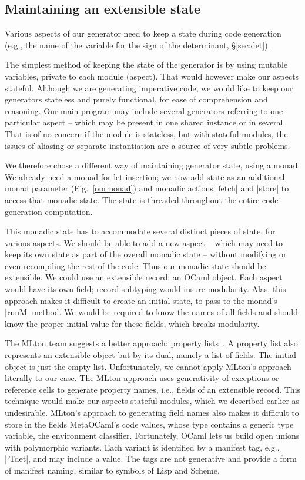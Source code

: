 \documentclass{elsart}
\begin{document}
\subsection{Maintaining an extensible state}

Various aspects of our generator need to keep a state during
code generation (e.g., the name of the variable for the sign of
the determinant, \S\ref{sec:det}).

The simplest method of keeping the state of the generator is by using
mutable variables, private to each module (aspect). That would however
make our aspects stateful. Although we are generating imperative code,
we would like to keep our generators stateless and purely functional,
for ease of comprehension and reasoning.  Our main program may include
several generators referring to one particular aspect -- which may be
present in one shared instance or in several. That is of no concern if
the module is stateless, but with stateful modules, the issues of
aliasing or separate instantiation are a source of very subtle
problems.

We therefore chose a different way of maintaining generator state,
using a monad. We already need a monad for let-insertion; we now add state as
an additional monad parameter (Fig.~\ref{ourmonad}) and monadic
actions |fetch| and |store| to access that monadic state. The state is
threaded throughout the entire code-generation computation. 

This monadic state has to accommodate several distinct pieces of state, for
various aspects. We should be able to add a new aspect -- which may need
to keep its own state as part of the overall monadic state -- without
modifying or even recompiling the rest of the code. Thus our monadic
state should be extensible. We could use an extensible
record: an OCaml object. Each aspect would have its own field; record
subtyping would insure modularity. Alas, this approach makes it
difficult to create an initial state, to pass to the monad's |runM|
method. We would be required to know the names of all fields and should know
the proper initial value for these fields, which breaks modularity.

The MLton team suggests a better approach: property 
lists~\cite{mlton-proplist}.  A property list also represents an
extensible object but by its dual, namely a list of fields.  The
initial object is just the empty list.  Unfortunately, we cannot apply
MLton's approach literally to our case. The MLton
approach uses generativity of exceptions or reference cells to
generate property names, i.e., fields of an extensible record. This
technique would make our aspects stateful modules, which we described
earlier as undesirable. MLton's approach to generating field
names also makes it difficult to store in the fields MetaOCaml's code
values, whose type contains a generic type variable, the environment
classifier. 
Fortunately, OCaml lets us build open unions with
polymorphic variants. Each variant is identified by a manifest tag,
e.g., |`Tdet|, and may include a value. The tags are not generative and
provide a form of manifest naming, similar to symbols of
Lisp and Scheme.
\end{document}
